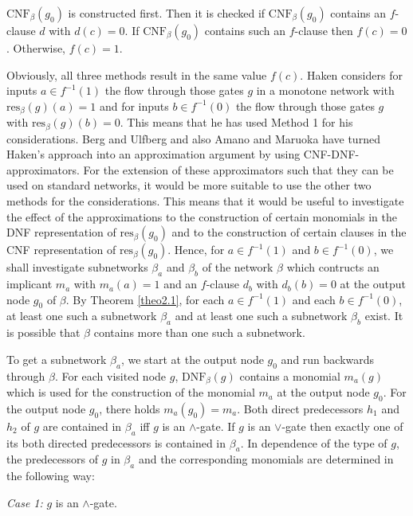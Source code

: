 \documentclass[11pt]{article}
\begin{document}
\smallskip
$\mbox{CNF}_{\beta}(g_0)$ is constructed first. Then it is checked if $\mbox{CNF}_{\beta}(g_0)$ contains an $f$-clause
$d$ with $d(c) = 0$. If $\mbox{CNF}_{\beta}(g_0)$ contains such an $f$-clause then $f(c) = 0$. Otherwise, $f(c) = 1$.

\smallskip
Obviously, all three methods result in the same value $f(c)$.
Haken \cite{Ha} considers for inputs $a \in f^{-1}(1)$ the flow through those gates $g$ in a monotone network with
$\mbox{res}_{\beta}(g)(a) = 1$ and for inputs $b \in f^{-1}(0)$ the flow through those gates $g$ with
$\mbox{res}_{\beta}(g)(b) = 0$.
This means that he has used Method 1 for his considerations. Berg and Ulfberg \cite{BeUl} and also Amano and
Maruoka \cite{AmMa} have turned Haken's approach into an approximation argument by using CNF-DNF-approximators. For
the extension of these approximators such that they
can be used on standard networks, it would be more suitable to use the other two methods for the considerations.
This means that it would be useful to investigate the effect of the approximations to the construction of certain
monomials in the DNF representation of $\mbox{res}_{\beta}(g_0)$ and to the construction of certain clauses in the
CNF representation of $\mbox{res}_{\beta}(g_0)$.
Hence, for $a \in f^{-1}(1)$ and $b \in f^{-1}(0)$, we shall investigate subnetworks $\beta_a$
and $\beta_b$ of the network $\beta$ which contructs an implicant $m_a$ with $m_a(a) = 1$ and an $f$-clause $d_b$
with $d_b(b) = 0$ at the output node $g_0$ of $\beta$. By Theorem \ref{theo2.1}, for each $a \in f^{-1}(1)$ and each
$b \in f^{-1}(0)$, at least one such a subnetwork $\beta_a$ and at least one such a subnetwork $\beta_b$ exist. It is
possible that $\beta$ contains more than one such a subnetwork.

To get a subnetwork $\beta_a$, we start at the output node $g_0$ and run backwards through $\beta$. For each visited
node $g$, $\mbox{DNF}_{\beta}(g)$ contains a monomial $m_a(g)$ which is used for the construction of the monomial $m_a$
at the output node $g_0$. For the output node $g_0$, there holds $m_a(g_0) = m_a$. Both direct predecessors $h_1$ and
$h_2$ of $g$ are contained in $\beta_a$ iff $g$ is an $\wedge$-gate. If $g$ is an $\vee$-gate then exactly one of its
both directed predecessors is contained in $\beta_a$. In dependence of the type of $g$, the predecessors of $g$ in
$\beta_a$ and the corresponding monomials are determined in the following way: 

\smallskip
\noindent
{\em Case 1:} $g$ is an $\wedge$-gate.
\end{document}
